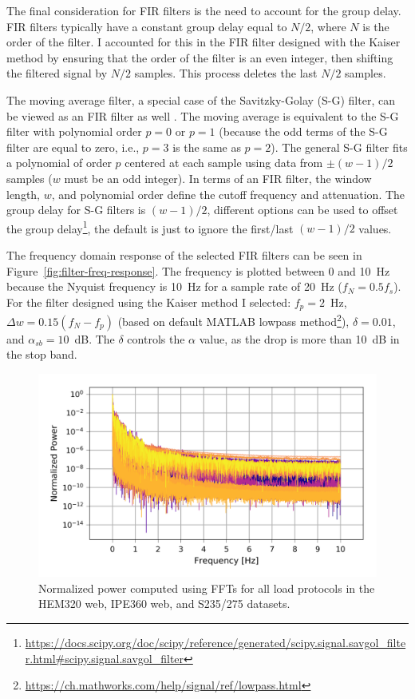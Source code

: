 \documentclass[a4paper,11pt]{article}
\begin{document}
The final consideration for FIR filters is the need to account for the group delay.
FIR filters typically have a constant group delay equal to $N / 2$, where $N$ is the order of the filter.
I accounted for this in the FIR filter designed with the Kaiser method by ensuring that the order of the filter is an even integer, then shifting the filtered signal by $N/2$ samples.
This process deletes the last $N/2$ samples.

The moving average filter, a special case of the Savitzky-Golay (S-G) filter, can be viewed as an FIR filter as well \citep{SchaferWhatSavitzkyGolayFilter2011}.
The moving average is equivalent to the S-G filter with polynomial order $p = 0$ or $p = 1$ (because the odd terms of the S-G filter are equal to zero, i.e., $p = 3$ is the same as $p = 2$).
The general S-G filter fits a polynomial of order $p$ centered at each sample using data from $\pm(w-1)/2$ samples ($w$ must be an odd integer).
In terms of an FIR filter, the window length, $w$, and polynomial order define the cutoff frequency and attenuation.
The group delay for S-G filters is $(w - 1) / 2$, different options can be used to offset the group delay\footnote{\url{https://docs.scipy.org/doc/scipy/reference/generated/scipy.signal.savgol\_filter.html\#scipy.signal.savgol\_filter}}, the default is just to ignore the first/last $(w - 1) / 2$ values.

The frequency domain response of the selected FIR filters can be seen in Figure~\ref{fig:filter-freq-response}.
The frequency is plotted between 0 and 10~Hz because the Nyquist frequency is 10~Hz for a sample rate of 20~Hz ($f_N = 0.5 f_s$).
For the filter designed using the Kaiser method I selected: $f_{p} = 2$~Hz, $\Delta w = 0.15 (f_N - f_{p})$ (based on default MATLAB lowpass method\footnote{\url{https://ch.mathworks.com/help/signal/ref/lowpass.html}}), 
$\delta = 0.01$, and $\alpha_{sb} = 10$~dB.
The $\delta$ controls the $\alpha$ value, as the drop is more than 10~dB in the stop band.


\begin{figure}
    \centering
    \includegraphics{frequency_power.png}
    \caption{Normalized power computed using FFTs for all load protocols in the HEM320 web, IPE360 web, and S235/275 datasets.}
    \label{fig:frequency-power}
\end{figure}
\end{document}

